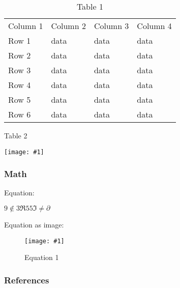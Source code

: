 \documentclass{article}
\newlength{\imgwidth}
\newcommand\scaledgraphics[2]{%
                
\settowidth{\imgwidth}{\texttt{[image: \#1]}}%
                
\setlength{\imgwidth}{\minof{\imgwidth}{#2\textwidth}}%
                
\texttt{[image: \#1]}%
                
}
\begin{document}
\begin{table}
\caption*{Table 1}\label{T66652301}

\begin{tabu} to \textwidth { |X|X|X|X| }
\hline



Column 1 & Column 2 & Column 3 & Column 4
 \\


Row 1 & data & data & data
 \\


Row 2 & data & data & data
 \\


Row 3 & data & data & data
 \\


Row 4 & data & data & data
 \\


Row 5 & data & data & data
 \\


Row 6 & data & data & data
 \\
\hline

\end{tabu}\end{table}


\begin{center}
\begin{table}
\caption*{Table 2}\label{F8966261}
\scaledgraphics{9e9b653f-c96b-4f61-94e3-84c0be199871.jpg}{0.5}
\end{table}


\end{center}


\subsubsection{Math}\label{H225619}



Equation:


$9\notin3\mathfrak{\Re }55\mathfrak{\Im }\ne\partial$


Equation as image:

\begin{figure}
\scaledgraphics{c15490e4-8fc0-4e3f-b49c-bbe51655b8d2.jpg}{0.5}
\caption*{Equation 1}\label{F9394491}
\end{figure}


\subsubsection{References}\label{H7100180}
\end{document}
